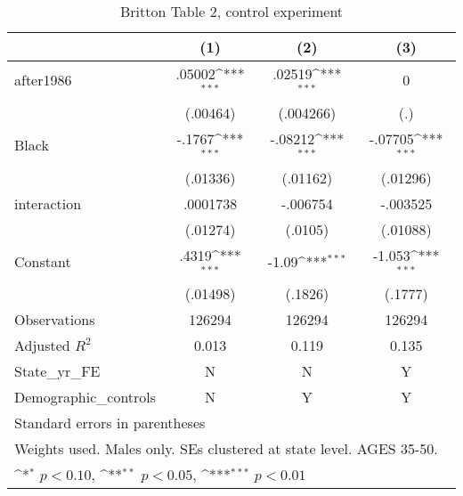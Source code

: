 \begin{table}[htbp]\centering
\def\sym#1{\ifmmode^{#1}\else\(^{#1}\)\fi}
\caption{Britton Table 2, control experiment}
\begin{tabular}{l*{3}{c}}
\hline\hline
                    &\multicolumn{1}{c}{(1)}         &\multicolumn{1}{c}{(2)}         &\multicolumn{1}{c}{(3)}         \\
\hline
after1986           &      .05002\sym{***}&      .02519\sym{***}&           0         \\
                    &    (.00464)         &   (.004266)         &         (.)         \\
[1em]
Black               &      -.1767\sym{***}&     -.08212\sym{***}&     -.07705\sym{***}\\
                    &    (.01336)         &    (.01162)         &    (.01296)         \\
[1em]
interaction         &    .0001738         &    -.006754         &    -.003525         \\
                    &    (.01274)         &     (.0105)         &    (.01088)         \\
[1em]
Constant            &       .4319\sym{***}&       -1.09\sym{***}&      -1.053\sym{***}\\
                    &    (.01498)         &     (.1826)         &     (.1777)         \\
\hline
Observations        &      126294         &      126294         &      126294         \\
Adjusted \(R^{2}\)  &       0.013         &       0.119         &       0.135         \\
State\_yr\_FE         &           N         &           N         &           Y         \\
Demographic\_controls&           N         &           Y         &           Y         \\
\hline\hline
\multicolumn{4}{l}{\footnotesize Standard errors in parentheses}\\
\multicolumn{4}{l}{\footnotesize Weights used. Males only. SEs clustered at state level. AGES 35-50.}\\
\multicolumn{4}{l}{\footnotesize \sym{*} \(p<0.10\), \sym{**} \(p<0.05\), \sym{***} \(p<0.01\)}\\
\end{tabular}
\end{table}
